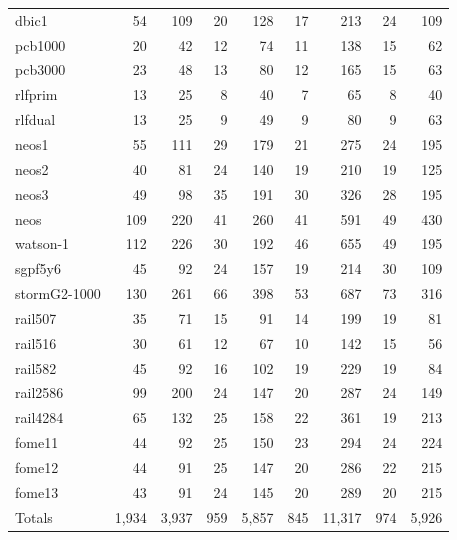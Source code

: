 {\begin{small}
\begin{longtable}{|l|rr|rr|rr|rr|}
dbic1 & 54 & 109 & 20 & 128 & 17 & 213 & 24 & 109 \\
pcb1000 & 20 & 42 & 12 & 74 & 11 & 138 & 15 & 62 \\
pcb3000 & 23 & 48 & 13 & 80 & 12 & 165 & 15 & 63 \\
rlfprim & 13 & 25 & 8 & 40 & 7 & 65 & 8 & 40 \\
rlfdual & 13 & 25 & 9 & 49 & 9 & 80 & 9 & 63 \\
neos1 & 55 & 111 & 29 & 179 & 21 & 275 & 24 & 195 \\
neos2 & 40 & 81 & 24 & 140 & 19 & 210 & 19 & 125 \\
neos3 & 49 & 98 & 35 & 191 & 30 & 326 & 28 & 195 \\
neos & 109 & 220 & 41 & 260 & 41 & 591 & 49 & 430 \\
watson-1 & 112 & 226 & 30 & 192 & 46 & 655 & 49 & 195 \\
sgpf5y6 & 45 & 92 & 24 & 157 & 19 & 214 & 30 & 109 \\
stormG2-1000 & 130 & 261 & 66 & 398 & 53 & 687 & 73 & 316 \\
rail507 & 35 & 71 & 15 & 91 & 14 & 199 & 19 & 81 \\
rail516 & 30 & 61 & 12 & 67 & 10 & 142 & 15 & 56 \\
rail582 & 45 & 92 & 16 & 102 & 19 & 229 & 19 & 84 \\
rail2586 & 99 & 200 & 24 & 147 & 20 & 287 & 24 & 149 \\
rail4284 & 65 & 132 & 25 & 158 & 22 & 361 & 19 & 213 \\
fome11 & 44 & 92 & 25 & 150 & 23 & 294 & 24 & 224 \\
fome12 & 44 & 91 & 25 & 147 & 20 & 286 & 22 & 215 \\
fome13 & 43 & 91 & 24 & 145 & 20 & 289 & 20 & 215 \\ \hline
   Totals & 1,934 & 3,937 & 959 & 5,857 & 845 & 11,317 & 974 & 5,926
\end{longtable} 
\end{small}
}
\setlength{\tabcolsep}{6pt}
